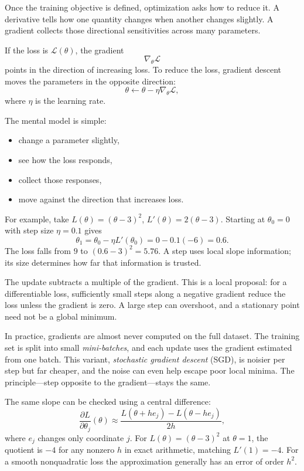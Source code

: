 Once the training objective is defined, optimization asks how to reduce it. A derivative tells how one quantity changes when another changes slightly. A gradient collects those directional sensitivities across many parameters.

If the loss is \(\mathcal{L}(\theta)\), the gradient
\[
\nabla_\theta \mathcal{L}
\]
points in the direction of increasing loss. To reduce the loss, gradient descent moves the parameters in the opposite direction:
\[
\theta \leftarrow \theta - \eta \nabla_\theta \mathcal{L},
\]
where \(\eta\) is the learning rate.

The mental model is simple:

\begin{itemize}[leftmargin=*]
\item change a parameter slightly,
\item see how the loss responds,
\item collect those responses,
\item move against the direction that increases loss.
\end{itemize}

For example, take $L(\theta)=(\theta-3)^2$,
$L'(\theta)=2(\theta-3)$. Starting at $\theta_0=0$ with step size
$\eta=0.1$ gives
\[
\theta_1=\theta_0-\eta L'(\theta_0)=0-0.1(-6)=0.6.
\]
The loss falls from $9$ to $(0.6-3)^2=5.76$. A step uses local
slope information; its size determines how far that information is trusted.

The update subtracts a multiple of the gradient. This is a local proposal: for a differentiable loss, sufficiently small steps along a negative gradient reduce the loss unless the gradient is zero. A large step can overshoot, and a stationary point need not be a global minimum.

In practice, gradients are almost never computed on the full dataset. The training set is split into small \emph{mini-batches}, and each update uses the gradient estimated from one batch. This variant, \emph{stochastic gradient descent} (SGD), is noisier per step but far cheaper, and the noise can even help escape poor local minima. The principle---step opposite to the gradient---stays the same.

The same slope can be checked using a central difference:
\[
\frac{\partial L}{\partial\theta_j}(\theta)
\approx \frac{L(\theta+h e_j)-L(\theta-h e_j)}{2h},
\]
where $e_j$ changes only coordinate $j$. For $L(\theta)=(\theta-3)^2$
at $\theta=1$, the quotient is $-4$ for any nonzero $h$ in exact
arithmetic, matching $L'(1)=-4$. For a smooth nonquadratic loss the
approximation generally has an error of order $h^2$.

